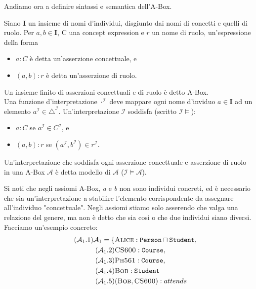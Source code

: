 Andiamo ora a definire sintassi e semantica dell'A-Box.
\begin{definition}
	\label{def:ABox}
	Siano $\mathbf{I}$ un insieme di nomi d'individui, disgiunto dai nomi di concetti e quelli di ruolo. Per $a, b \in \mathbf{I}$, C una concept expression e $r$ un nome di ruolo, un'espressione della forma
	\begin{itemize}
		\item $a : C$ è detta un'asserzione concettuale, e
		\item $(a, b) : r$ è detta un'asserzione di ruolo.
	\end{itemize}
	Un insieme finito di asserzioni concettuali e di ruolo è detto A-Box.\\
	Una funzione d'interpretazione $\cdot^\mathcal{I}$ deve mappare ogni nome d'inviduo $a \in \mathbf{I}$ ad un elemento $a^\mathcal{I} \in \triangle^\mathcal{I}$. Un'interpretazione $\mathcal{I}$ soddisfa (scritto $\mathcal{I} \models$):
	\begin{itemize}
		\item $a : C$ se $a^\mathcal{I} \in C^\mathcal{I}$, e
		\item $(a, b) : r$ se $(a^\mathcal{I}, b^\mathcal{I}) \in r^\mathcal{I}$.
	\end{itemize}
	Un'interpretazione che soddisfa ogni asserzione concettuale e asserzione di ruolo in una A-Box $\mathcal{A}$ è detta modello di $\mathcal{A}$ ($\mathcal{I} \models \mathcal{A}$).
\end{definition}
\noindent
Si noti che negli assiomi A-Box, \textit{a} e \textit{b} non sono individui concreti, ed è necessario che sia un’interpretazione a stabilire l'elemento corrispondente da assegnare all'individuo "concettuale". Negli assiomi stiamo solo asserendo che valga una relazione del genere, ma non è detto che sia così o che due individui siano diversi. Facciamo un'esempio concreto:
\begin{align}
	\tag{$\mathcal{A}_1$.1} \label{eq:A1.1}
	\mathcal{A}_1 = \{&\textsc{Alice} : \texttt{Person} \sqcap \texttt{Student},\\
	\tag{$\mathcal{A}_1$.2} \label{eq:A1.2}
	&\textsc{CS600} : \texttt{Course},\\
	\tag{$\mathcal{A}_1$.3} \label{eq:A1.3}
	&\textsc{Ph561} : \texttt{Course}, \\
	\tag{$\mathcal{A}_1$.4} \label{eq:A1.4}	
	&\textsc{Bob} : \texttt{Student}\\
	\tag{$\mathcal{A}_1$.5} \label{eq:A1.5}
	&(\textsc{Bob}, \textsc{CS600}) : attends\\
\end{align}
